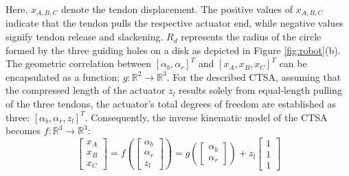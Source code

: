 Here, $x_{A,B,C}$ denote the tendon displacement. The positive values of $x_{A,B,C}$ indicate that the tendon pulls the respective actuator end, while negative values signify tendon release and slackening. $R_d$ represents the radius of the circle formed by the three guiding holes on a disk as depicted in Figure \ref{fig:robot}(b). The geometric correlation between $[\alpha_b, \alpha_r]^T$ and $[x_A, x_B, x_C]^T $ can be encapsulated as a function: $g: \mathbb{R}^2 \rightarrow \mathbb{R}^3$. For the described \ac{CTSA}, assuming that the compressed length of the actuator $z_l$ results solely from equal-length pulling of the three tendons, the actuator's total degrees of freedom are established as three: $[\alpha_b, \alpha_r, z_l]^T$. Consequently, the inverse kinematic model of the \ac{CTSA} becomes $f : \mathbb{R}^3 \rightarrow \mathbb{R}^3$:
\begin{equation}
    \begin{bmatrix}x_A\\x_B\\x_C\end{bmatrix} = f(\begin{bmatrix}\alpha_b\\ \alpha_r\\ z_l\end{bmatrix}) = g(\begin{bmatrix}\alpha_b\\ \alpha_r\end{bmatrix}) + z_l\begin{bmatrix}1\\1\\1\end{bmatrix}
    \label{eq:cov2eq}
\end{equation}


